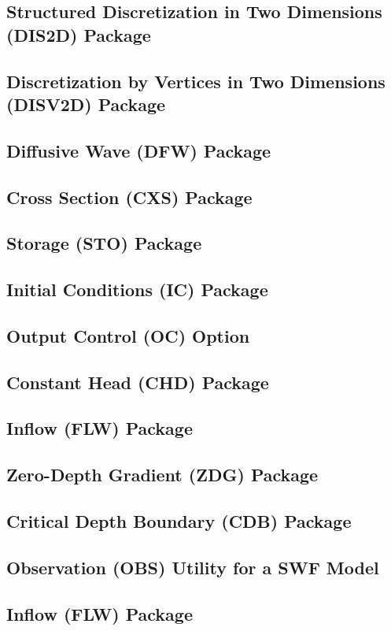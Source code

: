 \newpage
\subsection{Structured Discretization in Two Dimensions (DIS2D) Package}


\newpage
\subsection{Discretization by Vertices in Two Dimensions (DISV2D) Package}


\newpage
\subsection{Diffusive Wave (DFW) Package}


\newpage
\subsection{Cross Section (CXS) Package}


\newpage
\subsection{Storage (STO) Package}


\newpage
\subsection{Initial Conditions (IC) Package}


\newpage
\subsection{Output Control (OC) Option}


\newpage
\subsection{Constant Head (CHD) Package}


\newpage
\subsection{Inflow (FLW) Package}


\newpage
\subsection{Zero-Depth Gradient (ZDG) Package}


\newpage
\subsection{Critical Depth Boundary (CDB) Package}


\newpage
\subsection{Observation (OBS) Utility for a SWF Model}


\newpage
\subsection{Inflow (FLW) Package}




